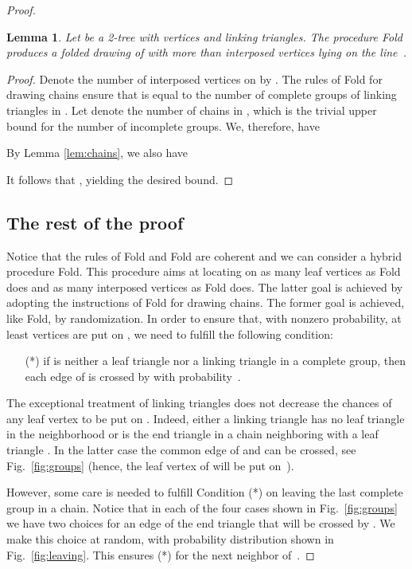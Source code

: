 \documentclass[reqno,12pt]{amsart}
\newcommand{\foldn}[1]{{\sc Fold}}
\newcommand{\fold}[2]{{\sc Fold}}
\newtheorem{lemma}[theorem]{Lemma}
\begin{document}
\begin{proof}
\begin{lemma}\label{lem:fold2}
Let  be a 2-tree with  vertices and  linking triangles.
The procedure \fold2{G,\ell} produces a folded drawing
of  with more than  interposed vertices lying on the line~.
\end{lemma}

\begin{proof}
Denote the number of interposed vertices on  by .
The rules of \foldn2 for drawing chains ensure that
 is equal to the number of complete groups of linking triangles in .
Let  denote the number of chains in , which is the trivial upper bound
for the number of incomplete groups. We, therefore, have

By Lemma \ref{lem:chains}, we also have

It follows that , yielding the desired bound.
\end{proof}



\subsection{The rest of the proof}

Notice that the rules of \foldn1 and \foldn2 are coherent
and we can consider a hybrid procedure \fold{1+2}{G,\ell}.
This procedure aims at locating on  as many leaf vertices
as \fold{1}{G,\ell} does and as many interposed vertices as
\fold{2}{G,\ell} does.
The latter goal is achieved by adopting the instructions of \foldn2
for drawing chains. The former goal is achieved, like \foldn1, 
by randomization. In order to ensure that, with nonzero probability,
at least  vertices are put on ,
we need to fulfill the following condition:
\begin{enumerate}
\item[(*)]
if  is neither a leaf triangle nor a linking triangle in a complete group, then
each edge of  is crossed by  with probability~.
\end{enumerate}
The exceptional treatment of linking triangles
does not decrease the chances of any leaf vertex to be put on .
Indeed, either a linking triangle  has no leaf triangle in the neighborhood or
 is the end triangle in a chain neighboring with a leaf triangle .
In the latter case the common edge of  and  can be crossed, see Fig.~\ref{fig:groups}
(hence, the leaf vertex of  will be put on~).

However, some care is needed to fulfill Condition (*)
on leaving the last complete group  in a chain. Notice that
in each of the four cases shown in Fig.~\ref{fig:groups} we have two choices for an edge of the
end triangle  that will be crossed by . We make this choice
at random, with probability distribution shown in Fig.~\ref{fig:leaving}.
This ensures (*) for the next neighbor  of~.


\end{proof}
\end{document}
